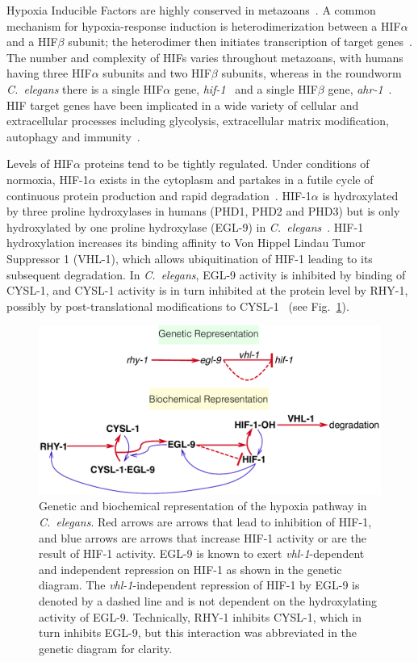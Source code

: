 \documentclass[10pt, onecolumn]{article}
\newcommand{\cel}{\emph{C.~elegans}}
\newcommand{\gene}[1]{\emph{#1}}
\newcommand{\eglp}{EGL-9}
\newcommand{\rhyp}{RHY-1}
\newcommand{\vhlp}{VHL-1}
\newcommand{\hifp}{HIF-1}
\newcommand{\cyslp}{CYSL-1}
\begin{document}
Hypoxia Inducible Factors are highly conserved in metazoans~\cite{Loenarz2011}.
A common mechanism for hypoxia-response induction is heterodimerization between a
HIF$\alpha$ and a HIF$\beta$ subunit; the heterodimer then initiates
transcription of target genes~\cite{Jiang1996}. The number and complexity of
HIFs varies throughout metazoans, with humans having three HIF$\alpha$ subunits
and two HIF$\beta$ subunits, whereas in the roundworm \cel{} there is a single
HIF$\alpha$ gene, \gene{hif-1}~\cite{Jiang2001} and a single HIF$\beta$
gene, \gene{ahr-1}~\cite{Powell-Coffman1998}. HIF target genes have been implicated
in a wide variety of cellular and extracellular processes including glycolysis,
extracellular matrix modification, autophagy and immunity~\cite{Semenza1994,
Bishop2004,Shen2005,Bellier2009,Semenza2012}.

Levels of HIF$\alpha$ proteins tend to be tightly regulated. Under conditions of
normoxia, \hifp{}$\alpha$ exists in the cytoplasm and partakes in a futile cycle
of continuous protein production and rapid degradation~\cite{Huang1996}.
\hifp{}$\alpha$ is hydroxylated by three proline hydroxylases
in humans (PHD1, PHD2 and PHD3) but is only hydroxylated by one proline
hydroxylase (\eglp{}) in \cel{}~\cite{Kaelin2008}. \hifp{} hydroxylation
increases its binding affinity to Von Hippel Lindau Tumor Suppressor 1
(\vhlp{}), which allows ubiquitination of \hifp{} leading to its subsequent
degradation. In \cel{}, \eglp{} activity is inhibited by binding of \cyslp{},
and \cyslp{} activity is in turn inhibited at the protein level by \rhyp{},
possibly by post-translational modifications to \cyslp{}~\cite{Ma2012} (see
Fig.~\ref{fig:pathway}).

\begin{figure}[tbhp]
\centering
\includegraphics[width=.7\linewidth]{../figs/HIF1pathway.pdf}
\caption{
Genetic and biochemical representation of the hypoxia pathway in \cel{}.
Red arrows are arrows that lead to inhibition of \hifp{}, and blue arrows
are arrows that increase \hifp{} activity or are the result of \hifp{} activity.
\eglp{} is known to exert \gene{vhl-1}-dependent and independent repression
on \hifp{} as shown in the genetic diagram. The \gene{vhl-1}-independent
repression of \hifp{} by \eglp{} is denoted by a dashed line and is not dependent
on the hydroxylating activity of \eglp{}.
Technically, RHY-1 inhibits CYSL-1, which in turn inhibits EGL-9, but this
interaction was abbreviated in the genetic diagram for clarity.
}
\label{fig:pathway}
\end{figure}
\end{document}
